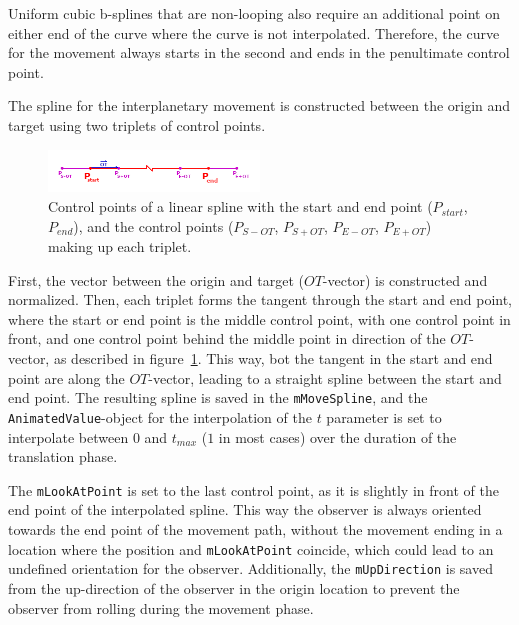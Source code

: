 Uniform cubic b-splines that are non-looping also require an additional point on either end of the curve where the
curve is not interpolated.
Therefore, the curve for the movement always starts in the second and ends in the penultimate control point.

The spline for the interplanetary movement is constructed between the origin and target using two triplets of control
points.

\begin{figure}[h]
    \centering
    \includegraphics[width=0.5\textwidth]{content/4_3_autoNavigation/img/LinearSplinePoints}
    \caption{Control points of a linear spline with the start and end point ($P_{start}$, $P_{end}$), and the control
    points ($P_{S-OT}$, $P_{S+OT}$, $P_{E-OT}$, $P_{E+OT}$) making up each triplet.}
    \label{fig:linear-control-points}
\end{figure}

First, the vector between the origin and target ($OT$-vector) is constructed and normalized.
Then, each triplet forms the tangent through the start and end point, where the start or end point is the middle
control point, with one control point in front, and one control point behind the middle point in direction of the
$OT$-vector, as described in figure~\ref{fig:linear-control-points}.
This way, bot the tangent in the start and end point are along the $OT$-vector, leading to a straight spline between
the start and end point.
The resulting spline is saved in the \texttt{mMoveSpline}, and the \texttt{AnimatedValue}-object for the
interpolation of the $t$ parameter is set to interpolate between $0$ and $t_{max}$ ($1$ in most cases) over the
duration of the translation phase.

The \texttt{mLookAtPoint} is set to the last control point, as it is slightly in front of the end point of the
interpolated spline.
This way the observer is always oriented towards the end point of the movement path, without the movement ending in a
location where the position and \texttt{mLookAtPoint} coincide, which could lead to an undefined orientation
for the observer.
Additionally, the \texttt{mUpDirection} is saved from the up-direction of the observer in the origin location to
prevent the observer from rolling during the movement phase.

